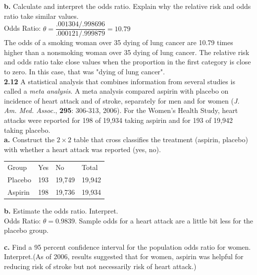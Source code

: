 \documentclass[paper=letter, fontsize=11pt]{scrartcl} %
\begin{document}
\textbf{b.} Calculate and interpret the odds ratio. Explain why the relative risk and odds ratio
take similar values. \\

Odds Ratio: $\theta = \dfrac{.001304/.998696}{.000121/.999879} = 10.79$ \\
The odds of a smoking woman over 35 dying of lung cancer are 10.79 times higher than a nonsmoking woman
over 35 dying of lung cancer. The relative risk and odds ratio take close values when the proportion in
the first category is close to zero. In this case, that was "dying of lung cancer". \\


\textbf{2.12} A statistical analysis that combines information from several studies is
called a \textit{meta analysis}. A meta analysis compared aspirin with placebo on
incidence of heart attack and of stroke, separately for men and for women
(\textit{J. Am. Med. Assoc.}, \textbf{295}: 306-313, 2006). For the Women's Health Study,
heart attacks were reported for 198 of 19,934 taking aspirin and for 193 of
19,942 taking placebo. \\

\textbf{a.} Construct the $2 \times 2$ table that cross classifies the treatment (aspirin,
placebo) with whether a heart attack was reported (yes, no). \\

\begin{table}[h]
\begin{tabular}{l|l|l|l}
Group   & Yes & No     & Total  \\
Placebo & 193 & 19,749 & 19,942 \\
Aspirin & 198 & 19,736 & 19,934
\end{tabular}
\end{table}

\textbf{b.} Estimate the odds ratio. Interpret. \\
Odds Ratio: $\theta = 0.9839$. Sample odds for a heart attack are a little bit less for the placebo group.

\textbf{c.} Find a 95 percent confidence interval for the population odds ratio for women.
Interpret.(As of 2006, results suggested that for women, aspirin was helpful 
for reducing risk of stroke but not necessarily risk of heart attack.) \\
\end{document}
